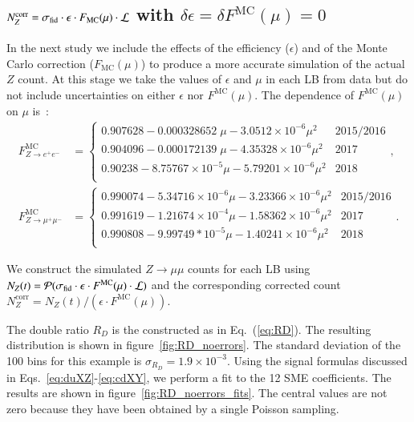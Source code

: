 \subsection{\texorpdfstring{
$N_Z^\text{corr} = \sigma_\text{fid} \cdot \epsilon \cdot F_\text{MC}(\mu)\cdot {\cal L}$ 
with $\delta \epsilon= \delta F^\text{MC}(\mu) = 0$}{NZcorr = sigmafid * epsilon * FMC * L with delta epsilon = delta FMC = 0}}
\label{ssec:no_eFMC_errors}
%
In the next study we include the effects of the efficiency ($\epsilon$) and of the Monte Carlo correction ($F_\text{MC}(\mu)$) to produce a more accurate simulation of the actual $Z$ count. At this stage we take the values of $\epsilon$ and $\mu$ in each LB from data but do not include uncertainties on either $\epsilon$ nor $F^\text{MC}(\mu)$. The dependence of $F^\text{MC}(\mu)$ on $\mu$ is~\cite{ATL-DAPR-PUB-2021-001}:
%
\begin{align}
F^\text{MC}_{Z\to e^+e^-} & = 
\begin{cases}
    0.907628 - 0.000328652\; \mu - 3.0512 \times 10^{-6} \mu^2 & 2015/2016 \\
    0.904096 - 0.000172139\; \mu - 4.35328\times 10^{-6} \mu^2 & 2017 \\
    0.90238 - 8.75767 \times 10^{-5} \mu - 5.79201 \times 10^{-6} \mu^2 & 2018 \\
\end{cases},
\\
F^\text{MC}_{Z\to \mu^+\mu^-} & = 
\begin{cases}
    0.990074 - 5.34716 \times 10^{-6} \mu - 3.23366 \times 10^{-6} \mu^2 & 2015/2016 \\
   0.991619 - 1.21674\times 10^{-4} \mu - 1.58362 \times 10^{-6} \mu^2 & 2017 \\
    0.990808 - 9.99749*10^{-5} \mu - 1.40241 \times 10^{-6} \mu^2 & 2018 \\
\end{cases}.
\end{align}

We construct the simulated $Z\to\mu\mu$ counts for each LB using $N_Z(t) =  {\cal P} ( \sigma_\text{fid} \cdot \epsilon \cdot F^\text{MC}(\mu) \cdot {\cal L})$ and the corresponding corrected count $N_Z^\text{corr} = N_Z(t)/(\epsilon \cdot F^\text{MC}(\mu))$. 

The double ratio $R_D$ is the constructed as in Eq.~(\ref{eq:RD}). The resulting distribution is shown in figure~\ref{fig:RD_noerrors}. The standard deviation of the 100 bins for this example is $\sigma_{R_D} = 1.9 \times 10^{-3}$. Using the signal formulas discussed in Eqs.~\ref{eq:duXZ}-\ref{eq:cdXY}, we perform a fit to the 12 SME coefficients. The results are shown in figure~\ref{fig:RD_noerrors_fits}. The central values are not zero because they have been obtained by a single Poisson sampling.

